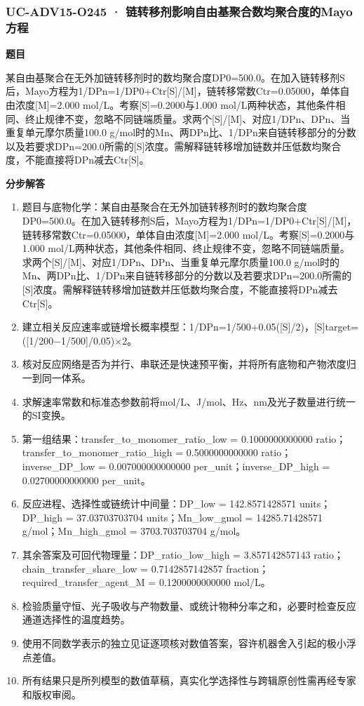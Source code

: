 \documentclass[UTF8,11pt,a4paper]{ctexart}
\begin{document}
\subsubsection*{UC-ADV15-O245 · 链转移剂影响自由基聚合数均聚合度的Mayo方程}
\noindent\textbf{题目}\par
某自由基聚合在无外加链转移剂时的数均聚合度DP0=500.0。在加入链转移剂S后，Mayo方程为1/DPn=1/DP0+Ctr[S]/[M]，链转移常数Ctr=0.05000，单体自由浓度[M]=2.000 mol/L。考察[S]=0.2000与1.000 mol/L两种状态，其他条件相同、终止规律不变，忽略不同链端质量。求两个[S]/[M]、对应1/DPn、DPn、当重复单元摩尔质量100.0 g/mol时的Mn、两DPn比、1/DPn来自链转移部分的分数以及若要求DPn=200.0所需的[S]浓度。需解释链转移增加链数并压低数均聚合度，不能直接将DPn减去Ctr[S]。\par
\medskip\noindent\textbf{分步解答}
\begin{enumerate}
\item 题目与底物化学：某自由基聚合在无外加链转移剂时的数均聚合度DP0=500.0。在加入链转移剂S后，Mayo方程为1/DPn=1/DP0+Ctr[S]/[M]，链转移常数Ctr=0.05000，单体自由浓度[M]=2.000 mol/L。考察[S]=0.2000与1.000 mol/L两种状态，其他条件相同、终止规律不变，忽略不同链端质量。求两个[S]/[M]、对应1/DPn、DPn、当重复单元摩尔质量100.0 g/mol时的Mn、两DPn比、1/DPn来自链转移部分的分数以及若要求DPn=200.0所需的[S]浓度。需解释链转移增加链数并压低数均聚合度，不能直接将DPn减去Ctr[S]。
\item 建立相关反应速率或链增长概率模型：1/DPn=1/500+0.05([S]/2)，[S]target=([1/200−1/500]/0.05)×2。
\item 核对反应网络是否为并行、串联还是快速预平衡，并将所有底物和产物浓度归一到同一体系。
\item 求解速率常数和标准态参数前将mol/L、J/mol、Hz、nm及光子数量进行统一的SI变换。
\item 第一组结果：transfer\_to\_monomer\_ratio\_low = 0.1000000000000 ratio；transfer\_to\_monomer\_ratio\_high = 0.5000000000000 ratio；inverse\_DP\_low = 0.007000000000000 per\_unit；inverse\_DP\_high = 0.02700000000000 per\_unit。
\item 反应进程、选择性或链统计中间量：DP\_low = 142.8571428571 units；DP\_high = 37.03703703704 units；Mn\_low\_gmol = 14285.71428571 g/mol；Mn\_high\_gmol = 3703.703703704 g/mol。
\item 其余答案及可回代物理量：DP\_ratio\_low\_high = 3.857142857143 ratio；chain\_transfer\_share\_low = 0.7142857142857 fraction；required\_transfer\_agent\_M = 0.1200000000000 mol/L。
\item 检验质量守恒、光子吸收与产物数量、或统计物种分率之和，必要时检查反应通道选择性的温度趋势。
\item 使用不同数学表示的独立见证逐项核对数值答案，容许机器舍入引起的极小浮点差值。
\item 所有结果只是所列模型的数值草稿，真实化学选择性与跨辑原创性需再经专家和版权审阅。
\end{enumerate}
\end{document}
